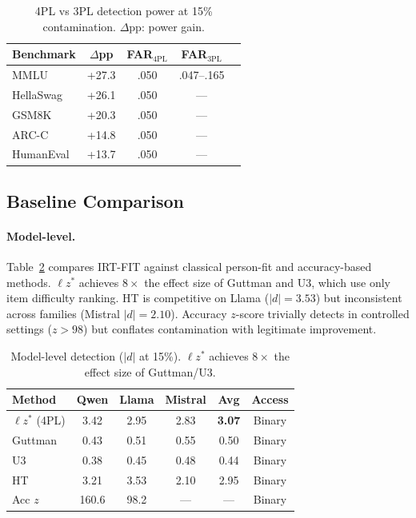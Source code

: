 \documentclass[11pt,a4paper]{article}
\begin{document}
\begin{table}[h]
\centering
\small
\begin{tabular}{lcccc}
\toprule
Benchmark & $\Delta$pp & FAR$_{\text{4PL}}$ & FAR$_{\text{3PL}}$ \\
\midrule
MMLU & +27.3 & .050 & .047--.165 \\
HellaSwag & +26.1 & .050 & --- \\
GSM8K & +20.3 & .050 & --- \\
ARC-C & +14.8 & .050 & --- \\
HumanEval & +13.7 & .050 & --- \\
\bottomrule
\end{tabular}
\caption{4PL vs 3PL detection power at 15\% contamination. $\Delta$pp: power gain.}
\label{tab:4pl_3pl}
\end{table}

\subsection{Baseline Comparison}
\label{sec:baselines}

\paragraph{Model-level.}
Table~\ref{tab:baselines_model} compares IRT-FIT against classical person-fit and accuracy-based methods.
$\ell z^*$ achieves $8\times$ the effect size of Guttman and U3, which use only item difficulty ranking.
HT is competitive on Llama ($|d|{=}3.53$) but inconsistent across families (Mistral $|d|{=}2.10$).
Accuracy $z$-score trivially detects in controlled settings ($z > 98$) but conflates contamination with legitimate improvement.

\begin{table}[h]
\centering
\small
\begin{tabular}{lccccc}
\toprule
Method & Qwen & Llama & Mistral & \textbf{Avg} & Access \\
\midrule
$\ell z^*$ (4PL) & 3.42 & 2.95 & 2.83 & \textbf{3.07} & Binary \\
Guttman & 0.43 & 0.51 & 0.55 & 0.50 & Binary \\
U3 & 0.38 & 0.45 & 0.48 & 0.44 & Binary \\
HT & 3.21 & 3.53 & 2.10 & 2.95 & Binary \\
Acc $z$ & 160.6 & 98.2 & --- & --- & Binary \\
\bottomrule
\end{tabular}
\caption{Model-level detection ($|d|$ at 15\%). $\ell z^*$ achieves $8\times$ the effect size of Guttman/U3.}
\label{tab:baselines_model}
\end{table}
\end{document}
